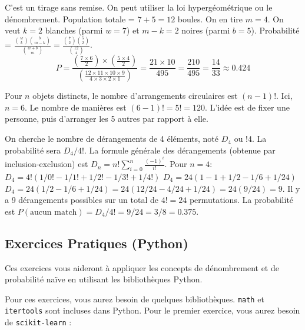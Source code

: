 \begin{correctionbox}
C'est un tirage sans remise. On peut utiliser la loi hypergéométrique ou le dénombrement.
Population totale = $7+5=12$ boules. On en tire $m=4$.
On veut $k=2$ blanches (parmi $w=7$) et $m-k=2$ noires (parmi $b=5$).
Probabilité = $\frac{\binom{w}{k} \binom{b}{m-k}}{\binom{w+b}{m}} = \frac{\binom{7}{2} \binom{5}{2}}{\binom{12}{4}}$.
$$ P = \frac{(\frac{7 \times 6}{2}) \times (\frac{5 \times 4}{2})}{(\frac{12 \times 11 \times 10 \times 9}{4 \times 3 \times 2 \times 1})} = \frac{21 \times 10}{495} = \frac{210}{495} = \frac{14}{33} \approx 0.424 $$
\end{correctionbox}

\begin{correctionbox}
Pour $n$ objets distincts, le nombre d'arrangements circulaires est $(n-1)!$.
Ici, $n=6$. Le nombre de manières est $(6-1)! = 5! = 120$.
L'idée est de fixer une personne, puis d'arranger les 5 autres par rapport à elle.
\end{correctionbox}

\begin{correctionbox}
On cherche le nombre de dérangements de 4 éléments, noté $D_4$ ou $!4$. La probabilité sera $D_4 / 4!$.
La formule générale des dérangements (obtenue par inclusion-exclusion) est $D_n = n! \sum_{i=0}^n \frac{(-1)^i}{i!}$.
Pour $n=4$:
$D_4 = 4! (1/0! - 1/1! + 1/2! - 1/3! + 1/4!)$
$D_4 = 24 (1 - 1 + 1/2 - 1/6 + 1/24)$
$D_4 = 24 (1/2 - 1/6 + 1/24) = 24 (12/24 - 4/24 + 1/24) = 24 (9/24) = 9$.
Il y a 9 dérangements possibles sur un total de $4! = 24$ permutations.
La probabilité est $P(\text{aucun match}) = D_4 / 4! = 9/24 = 3/8 = 0.375$.
\end{correctionbox}

\subsection{Exercices Pratiques (Python)}

Ces exercices vous aideront à appliquer les concepts de dénombrement et de probabilité naïve en utilisant les bibliothèques Python.

Pour ces exercices, vous aurez besoin de quelques bibliothèques. \texttt{math} et \texttt{itertools} sont incluses dans Python. Pour le premier exercice, vous aurez besoin de \texttt{scikit-learn} :

